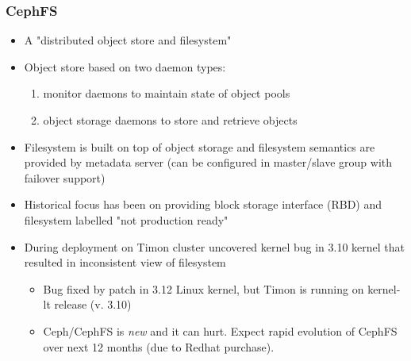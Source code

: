 \documentclass[handout]{beamer}
\begin{document}
\begin{frame}
\frametitle{CephFS}
\begin{itemize}
\item A "distributed object store and filesystem"
\item Object store based on two daemon types:
\begin{enumerate}
\item monitor daemons to maintain state of object pools
\item object storage daemons to store and retrieve objects
\end{enumerate}
\item Filesystem is built on top of object storage and filesystem semantics are provided by metadata server (can be configured in master/slave group with failover support)
\pause
\item Historical focus has been on providing block storage interface (RBD) and filesystem labelled "not production ready"
\item During deployment on Timon cluster uncovered kernel bug in 3.10 kernel that resulted in inconsistent view of filesystem
\begin{itemize}
\item Bug fixed by patch in 3.12 Linux kernel, but Timon is running on kernel-lt release (v. 3.10)
\item Ceph/CephFS is \emph{new} and it can hurt. Expect rapid evolution of CephFS over next 12 months (due to Redhat purchase).
\end{itemize}
\end{itemize}
\end{frame}
\end{document}
